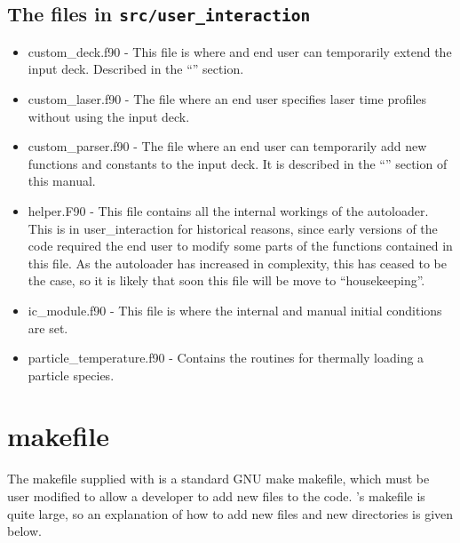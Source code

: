 \documentclass[12pt,a4paper]{article}
\newcommand{\inlinecode}[1]{{\color{warwickred} \bf\texttt{#1}}}
\newcommand{\EPOCH}{{\color{warwickdark}\fontfamily{phv}\selectfont{EPOCH}}}
\begin{document}
\subsection{The files in \inlinecode{src/user\_interaction}}
\begin{itemize}
\item custom\_deck.f90 - This file is where and end user can temporarily
  extend the input deck. Described in the ``''
  section.
\item custom\_laser.f90 - The file where an end user specifies laser time
  profiles without using the input deck.
\item custom\_parser.f90 - The file where an end user can temporarily add new
  functions and constants to the input deck. It is described in the
  ``'' section of this manual.
\item helper.F90 - This file contains all the internal workings of the
  autoloader. This is in user\_interaction for historical reasons, since early
  versions of the code required the end user to modify some parts of the
  functions contained in this file. As the autoloader has increased in
  complexity, this has ceased to be the case, so it is likely that soon this
  file will be move to ``housekeeping''.
\item ic\_module.f90 - This file is where the internal and manual initial
  conditions are set.
\item particle\_temperature.f90 - Contains the routines for thermally loading
  a particle species.
\end{itemize}

\section{{\EPOCH} makefile}

The makefile supplied with {\EPOCH} is a standard GNU make makefile, which must
be user modified to allow a developer to add new files to the code. {\EPOCH}'s
makefile is quite large, so an explanation of how to add new files and new
directories is given below.
\end{document}
